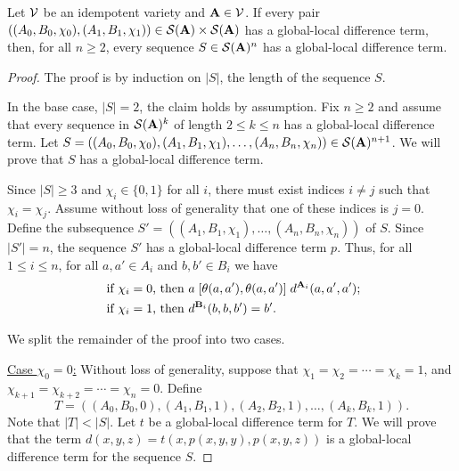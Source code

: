 \begin{thm}
  \label{thm:glob-loc-diff-terms}
  Let $\mathcal{V}$ be an idempotent variety and
  $\mathbf{A} \in \mathcal{V}$. 
  If every pair
  $((A_0, B_0, \chi_0), (A_1, B_1, \chi_1)) \in \mathcal{S}(\mathbf{A}) \times \mathcal{S}(\mathbf{A})$
  has a global-local difference term,
  then, for all $n\geq 2$, every sequence $S \in \mathcal{S}(\mathbf{A})^n$
  has a global-local difference term.
\end{thm}
\begin{proof}
The proof is by induction on $|S|$, the length of the sequence
$S$.

In the base case, $|S| = 2$, the claim holds by assumption.
Fix $n\geq 2$ and assume that every sequence in $\mathcal{S}(\mathbf{A})^k$ of length $2\leq k \leq n$ has
a global-local difference term. Let
$S = ((A_0, B_0, \chi_0), (A_1, B_1, \chi_1), \dots, (A_{n}, B_{n},\chi_{n})) \in \mathcal{S}(\mathbf{A})^{n+1}$.
We will prove that $S$ has a global-local difference term.

Since $|S| \geq 3$ and $\chi_i \in \{0,1\}$ for all $i$, there must exist
indices $i\neq j$ such that $\chi_i = \chi_j$. Assume without loss of generality
that one of these indices is $j=0$.  Define the subsequence
$S' = ((A_1, B_1, \chi_1), \dots,(A_{n}, B_{n},\chi_{n}))$ of $S$. %
Since $|S'| = n$, the sequence $S'$ has a global-local difference term $p$.
Thus, for all $1\leq i \leq n$,
for all $a, a'\in A_i$ and $b, b' \in B_i$ we have
\begin{align*}
  \text{ if $\chi_i=0$, then } &
  a \mathrel{[\theta(a,a'), \theta(a,a')]} d^{\mathbf{A}_i}(a,a',a');\\
  \text{ if $\chi_i=1$, then } &
  d^{\mathbf{B}_i}(b,b,b') = b'.
\end{align*}

We split the remainder of the proof into two cases.%

\vskip3mm

\noindent \underline{Case $\chi_0 = 0$:}
Without loss of generality, suppose that
$\chi_1 = \chi_2 = \cdots =\chi_k = 1$,
and
$\chi_{k+1} = \chi_{k+2} = \cdots = \chi_{n} = 0$.
Define
\[
T = ((A_0, B_0, 0), (A_1, B_1, 1), (A_2, B_2, 1), \dots, (A_k, B_k, 1)).
\]
Note that $|T| < |S|$.
Let $t$ be a global-local difference term for $T$.
We will prove that the term $d(x,y,z) = t(x, p(x,y,y), p(x,y,z))$
is a global-local difference term for the sequence $S$.


\end{proof}
